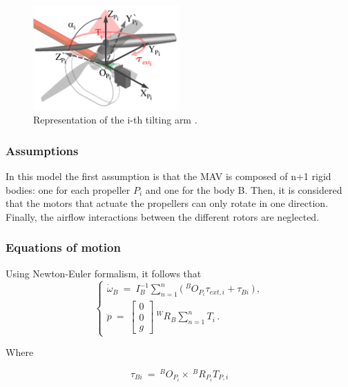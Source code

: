 \begin{figure}[h]
  \centering
  \includegraphics[width=0.5\textwidth]{images/tilt_model.png}
  \caption{Representation of the i-th tilting arm \citep{ryll_modeling_2012}.}
  \label{fig:tilt_model}
\end{figure}

\subsubsection{Assumptions}
\label{sec:assumptions}
In this model the first assumption is that the MAV is composed of n+1 rigid bodies:
one for each propeller $P_i$ and one for the body B. Then, it is considered that
the motors that actuate the propellers can only rotate in one direction. Finally,
the airflow interactions between the different rotors are neglected.

\subsubsection{Equations of motion}
\label{sec:equations}
Using Newton-Euler formalism, it follows that
\begin{equation}
  \label{acc_eq}
  \begin{cases}
    \dot{\omega}_B  \ = \ I_B^{-1} \sum_{n=1}^{n}  \big(\ ^{B}O_{P_{i}} \tau_{ext,i} + \tau_{Bi} \ \big) \, ,\\
    \ddot{p}  \ = \
    \begin{bmatrix}
      0 \\
      0 \\
      g
    \end{bmatrix}
    \ ^{W}R_B \sum_{n=1}^{n} T_i \, .
  \end{cases}
\end{equation}

Where

\begin{equation}
  \label{tau_b_i}
  \tau_{Bi}  \ = \ ^{B}O_{P_{i}} \times\   ^{B}R_{P_{i}} T_{P,i}
\end{equation}

